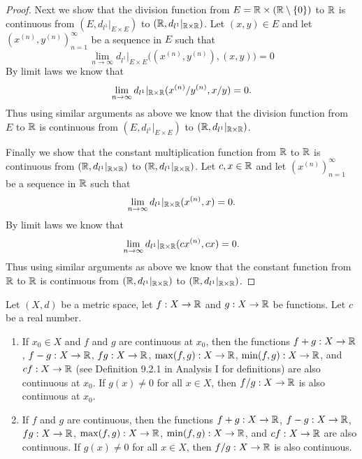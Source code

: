 \begin{proof}
  Next we show that the division function from \(E = \mathbb{R} \times (\mathbb{R} \setminus \left\lbrace0\right\rbrace)\) to \(\mathbb{R}\) is continuous from \((E, d_{l^1}|_{E \times E})\) to \((\mathbb{R}, d_{l^1}|_{\mathbb{R} \times \mathbb{R}})\).
  Let \((x, y) \in E\) and let \((x^{(n)}, y^{(n)})_{n = 1}^\infty\) be a sequence in \(E\) such that
  \[
    \lim_{n \to \infty} d_{l^1}|_{E \times E}\big((x^{(n)}, y^{(n)}), (x, y)\big) = 0
  \]
  By limit laws we know that
  \[
    \lim_{n \to \infty} d_{l^1}|_{\mathbb{R} \times \mathbb{R}}(x^{(n)} / y^{(n)}, x / y) = 0.
  \]
  Thus using similar arguments as above we know that the division function from \(E\) to \(\mathbb{R}\) is continuous from \((E, d_{l^1}|_{E \times E})\) to \((\mathbb{R}, d_{l^1}|_{\mathbb{R} \times \mathbb{R}})\).

  Finally we show that the constant multiplication function from \(\mathbb{R}\) to \(\mathbb{R}\) is continuous from \((\mathbb{R}, d_{l^1}|_{\mathbb{R} \times \mathbb{R}})\) to \((\mathbb{R}, d_{l^1}|_{\mathbb{R} \times \mathbb{R}})\).
  Let \(c, x \in \mathbb{R}\) and let \((x^{(n)})_{n = 1}^\infty\) be a sequence in \(\mathbb{R}\) such that
  \[
    \lim_{n \to \infty} d_{l^1}|_{\mathbb{R} \times \mathbb{R}}(x^{(n)}, x) = 0.
  \]
  By limit laws we know that
  \[
    \lim_{n \to \infty} d_{l^1}|_{\mathbb{R} \times \mathbb{R}}(cx^{(n)}, cx) = 0.
  \]
  Thus using similar arguments as above we know that the constant function from \(\mathbb{R}\) to \(\mathbb{R}\) is continuous from \((\mathbb{R}, d_{l^1}|_{\mathbb{R} \times \mathbb{R}})\) to \((\mathbb{R}, d_{l^1}|_{\mathbb{R} \times \mathbb{R}})\).
\end{proof}

\begin{cor}\label{ii:2.2.3}
  Let \((X, d)\) be a metric space, let \(f : X \to \mathbb{R}\) and \(g : X \to \mathbb{R}\) be functions.
  Let \(c\) be a real number.
  \begin{enumerate}
    \item If \(x_0 \in X\) and \(f\) and \(g\) are continuous at \(x_0\), then the functions \(f + g : X \to \mathbb{R}\), \(f - g : X \to \mathbb{R}\), \(fg : X \to \mathbb{R}\), \(\max(f, g) : X \to \mathbb{R}\), \(\min(f, g) : X \to \mathbb{R}\), and \(cf : X \to \mathbb{R}\) (see Definition 9.2.1 in Analysis I for definitions) are also continuous at \(x_0\).
          If \(g(x) \neq 0\) for all \(x \in X\), then \(f / g : X \to \mathbb{R}\) is also continuous at \(x_0\).
    \item If \(f\) and \(g\) are continuous, then the functions \(f + g : X \to \mathbb{R}\), \(f - g : X \to \mathbb{R}\), \(fg : X \to \mathbb{R}\), \(\max(f, g) : X \to \mathbb{R}\), \(\min(f, g) : X \to \mathbb{R}\), and \(cf : X \to \mathbb{R}\) are also continuous.
          If \(g(x) \neq 0\) for all \(x \in X\), then \(f / g : X \to \mathbb{R}\) is also continuous.
  \end{enumerate}
\end{cor}

